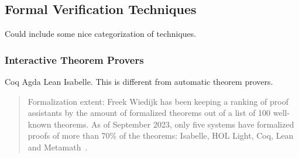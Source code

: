 \subsection{Formal Verification Techniques}
\label{subsec:fml}


Could include some nice categorization of techniques.

\subsubsection{Interactive Theorem Provers}

Coq Agda Lean Isabelle.
This is different from automatic theorem provers.

\begin{quote}
Formalization extent:
Freek Wiedijk has been keeping a ranking of proof
assistants by the amount of formalized theorems out of a list of 100 well-known theorems.
As of September 2023, only five systems have formalized proofs of more
than 70\% of the theorems: Isabelle, HOL Light, Coq, Lean and
Metamath~\cite{proofassistants}.
\end{quote}

